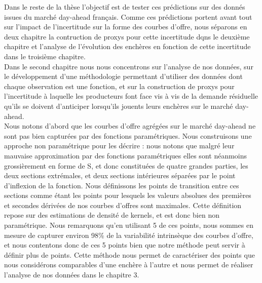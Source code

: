 Dans le reste de la thèse l'objectif est de tester ces prédictions sur des donnés issues du marché day-ahead français. Comme ces prédictions portent avant tout sur l'impact de l'incertitude sur la forme des courbes d'offre, nous séparons en deux chapitre la contruction de proxys pour cette incertitude dqns le deuxième chapitre et l'analyse de l'évolution des enchères en fonction de cette incertitude dans le troisième chapitre.\\

Dans le second chapitre nous nous concentrons sur l'analyse de nos données, sur le développement d'une méthodologie permettant d'utiliser des données dont chaque observation est une fonction, et sur la construction de proxys pour l'incertitude à laquelle les producteurs font face vis à vis de la demande résiduelle qu'ils se doivent d'anticiper lorsqu'ils jouents leurs enchères sur le marché day-ahead.\\

Nous notons d'abord que les courbes d'offre agrégées sur le marché day-ahead ne sont pas bien capturées par des fonctions paramétriques. Nous construisons une approche non paramétrique pour les décrire : nous notons que malgré leur mauvaise approximation par des fonctions paramétriques elles sont néanmoins grossièrement en forme de S, et donc constituées de quatre grandes parties, les deux sections extrémales, et deux sections intérieures séparées par le point d'inflexion de la fonction. Nous définissons les points de transition entre ces sections comme étant les points pour lesquels les valeurs absolues des premières et secondes dérivées de nos courbes d'offres sont maximales. Cette définition repose sur des estimations de densité de kernels, et est donc bien non paramétrique. Nous remarquons qu'en utilisant 5 de ces points, nous sommes en mesure de capturer environ 98\% de la variabilité intrinsèque des courbes d'offre, et nous contentons donc de ces 5 points bien que notre méthode peut servir à définir plus de points. Cette méthode nous permet de caractériser des points que nous considérons comparables d'une enchère à l'autre et nous permet de réaliser l'analyse de nos données dans le chapitre 3.\\

